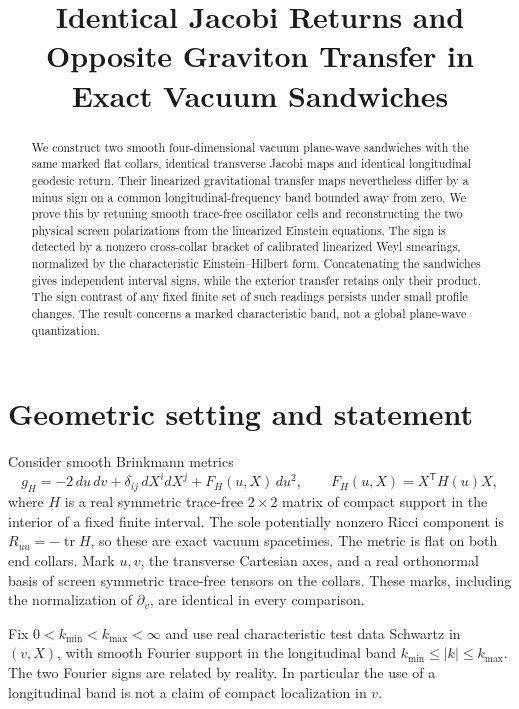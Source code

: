 \documentclass[11pt]{article}
\title{Identical Jacobi Returns and Opposite Graviton Transfer in Exact Vacuum Sandwiches}
\author{}
\date{}
\begin{document}
\maketitle
\begin{abstract}
We construct two smooth four-dimensional vacuum plane-wave sandwiches with the same marked flat collars, identical transverse Jacobi maps and identical longitudinal geodesic return. Their linearized gravitational transfer maps nevertheless differ by a minus sign on a common longitudinal-frequency band bounded away from zero. We prove this by retuning smooth trace-free oscillator cells and reconstructing the two physical screen polarizations from the linearized Einstein equations. The sign is detected by a nonzero cross-collar bracket of calibrated linearized Weyl smearings, normalized by the characteristic Einstein--Hilbert form. Concatenating the sandwiches gives independent interval signs, while the exterior transfer retains only their product. The sign contrast of any fixed finite set of such readings persists under small profile changes. The result concerns a marked characteristic band, not a global plane-wave quantization.
\end{abstract}

\section{Geometric setting and statement}
Consider smooth Brinkmann metrics
\begin{equation}
 g_H=-2\,du\,dv+\delta_{ij}\,dX^i dX^j+F_H(u,X)\,du^2,
 \qquad F_H(u,X)=X^\mathsf{T}H(u)X ,
 \label{eq:metric}
\end{equation}
where $H$ is a real symmetric trace-free $2\times2$ matrix of compact support in the interior of a fixed finite interval. The sole potentially nonzero Ricci component is $R_{uu}=-\operatorname{tr}H$, so these are exact vacuum spacetimes. The metric is flat on both end collars. Mark $u,v$, the transverse Cartesian axes, and a real orthonormal basis of screen symmetric trace-free tensors on the collars. These marks, including the normalization of $\partial_v$, are identical in every comparison.

Fix $0<k_{\min}<k_{\max}<\infty$ and use real characteristic test data Schwartz in $(v,X)$, with smooth Fourier support in the longitudinal band $k_{\min}\le |k|\le k_{\max}$. The two Fourier signs are related by reality. In particular the use of a longitudinal band is not a claim of compact localization in $v$.
\end{document}
